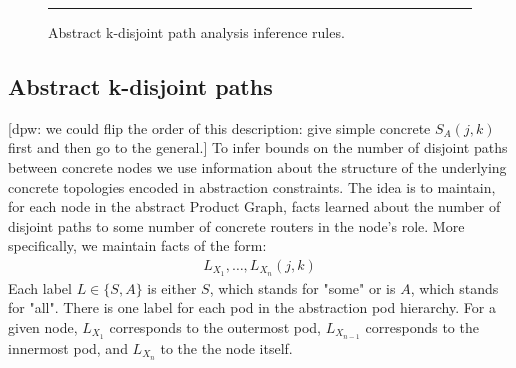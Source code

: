 \documentclass[numbers, 10pt, preprint]{sigplanconf}
\newcommand{\dpw}[1]{\textcolor{tmlblue}{[dpw: #1]}}
\begin{document}
\begin{figure}[t!]
  \begin{minipage}[t]{\linewidth}%
  \end{minipage}

  \vspace*{1em}
  \begin{minipage}[t]{\linewidth}%
  \end{minipage}

  \hrule
  \vspace*{1em}
  \caption{Abstract k-disjoint path analysis inference rules.}
  \label{fig:inference-rules}
\end{figure}


\subsection{Abstract k-disjoint paths}
\label{sec:property-checking}

\dpw{we could flip the order of this description:  give simple concrete $S_A(j,k)$ first and
then go to the general.}
To infer bounds on the number of disjoint paths between concrete nodes we use information about the structure of the underlying concrete topologies encoded in abstraction constraints.
%
The idea is to maintain, for each node in the abstract Product Graph, facts learned about the number of disjoint paths to some number of concrete routers in the node's role. More specifically, we maintain facts of the form:
%
\[ \begin{array}{c}
  L_{X_1}, \ldots, L_{X_n}(j,k)
\end{array} \]
\noindent
%
Each label $L \in \{S,A\}$ is either $S$, which stands for "some" or is $A$, which stands for "all". There is one label for each pod in the abstraction pod hierarchy. For a given node, $L_{X_1}$ corresponds to the outermost pod, $L_{X_{n-1}}$ corresponds to the innermost pod, and $L_{X_n}$ to the the node itself.
\end{document}
